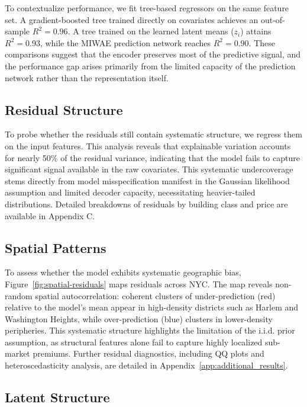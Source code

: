 \documentclass{article}
\begin{document}

To contextualize performance, we fit tree-based regressors on the same feature set. A gradient-boosted tree trained directly on covariates achieves an out-of-sample $R^2 = 0.96$. A tree trained on the learned latent means ($z_i$) attains $R^2 = 0.93$, while the MIWAE prediction network reaches $R^2 = 0.90$. These comparisons suggest that the encoder preserves most of the predictive signal, and the performance gap arises primarily from the limited capacity of the prediction network rather than the representation itself.

\subsection{Residual Structure}

To probe whether the residuals still contain systematic structure, we regress them on the input features. This analysis reveals that explainable variation accounts for nearly 50\% of the residual variance, indicating that the model fails to capture significant signal available in the raw covariates. This systematic undercoverage stems directly from model misspecification manifest in the Gaussian likelihood assumption and limited decoder capacity, necessitating heavier-tailed distributions. Detailed breakdowns of residuals by building class and price are available in Appendix C.

\subsection{Spatial Patterns}

To assess whether the model exhibits systematic geographic bias, Figure~\ref{fig:spatial-residuals} maps residuals across NYC. The map reveals non-random spatial autocorrelation: coherent clusters of under-prediction (red) relative to the model's mean appear in high-density districts such as Harlem and Washington Heights, while over-prediction (blue) clusters in lower-density peripheries. This systematic structure highlights the limitation of the i.i.d. prior assumption, as structural features alone fail to capture highly localized sub-market premiums. Further residual diagnostics, including QQ plots and heteroscedasticity analysis, are detailed in Appendix~\ref{app:additional_results}.


\subsection{Latent Structure}
\end{document}
